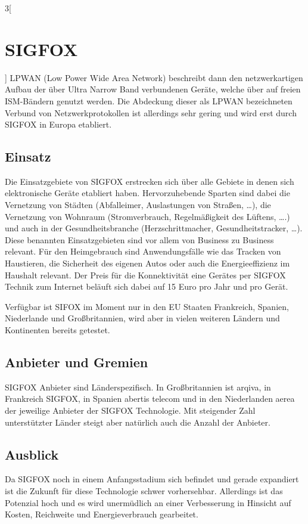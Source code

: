 \begin{multicols}{3}[\section{SIGFOX}]
LPWAN (Low Power Wide Area Network) beschreibt dann den netzwerkartigen Aufbau der über Ultra Narrow Band verbundenen Geräte, welche über auf freien ISM-Bändern genutzt werden. Die Abdeckung dieser als LPWAN bezeichneten Verbund von Netzwerkprotokollen ist allerdings sehr gering und wird erst durch SIGFOX in Europa etabliert.~\cite{sigfox.4}


\subsection*{Einsatz}
Die Einsatzgebiete von SIGFOX erstrecken sich über alle Gebiete in denen sich elektronische Geräte etabliert haben. Hervorzuhebende Sparten sind dabei die Vernetzung von Städten (Abfalleimer, Auslastungen von Straßen, …), die Vernetzung von Wohnraum (Stromverbrauch, Regelmäßigkeit des Lüftens, ….) und auch in der Gesundheitsbranche (Herzschrittmacher, Gesundheitstracker, …). Diese benannten Einsatzgebieten sind vor allem von Business zu Business relevant. Für den Heimgebrauch sind Anwendungsfälle wie das Tracken von Haustieren, die Sicherheit des eigenen Autos oder auch die Energieeffizienz im Haushalt relevant. Der Preis für die Konnektivität eine Gerätes per SIGFOX Technik zum Internet beläuft sich dabei auf 15 Euro pro Jahr und pro Gerät.

Verfügbar ist SIFOX im Moment nur in den EU Staaten Frankreich, Spanien, Niederlande und Großbritannien, wird aber in vielen weiteren Ländern und Kontinenten bereits getestet.~\cite{sigfox.2}


\subsection*{Anbieter und Gremien}

SIGFOX Anbieter sind Länderspezifisch. In Großbritannien ist arqiva, in Frankreich SIGFOX, in Spanien abertis telecom und in den Niederlanden aerea der jeweilige Anbieter der SIGFOX Technologie. Mit steigender Zahl unterstützter Länder steigt aber natürlich auch die Anzahl der Anbieter.~\cite{sigfox.1}

\subsection*{Ausblick}

Da SIGFOX noch in einem Anfangsstadium sich befindet und gerade expandiert ist die Zukunft für diese Technologie schwer vorhersehbar. Allerdings ist das Potenzial hoch und es wird unermüdlich an einer Verbesserung in Hinsicht auf Kosten, Reichweite und Energieverbrauch gearbeitet.~\cite{sigfox.3}


\end{multicols}
